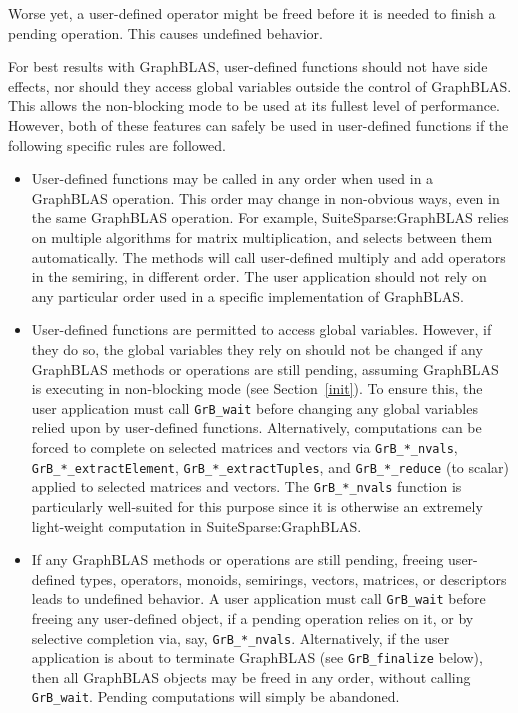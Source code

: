 \documentclass[12pt]{article}
\begin{document}
Worse yet, a user-defined operator might be freed before it is needed to finish
a pending operation.  This causes undefined behavior.

For best results with GraphBLAS, user-defined functions should not have side
effects, nor should they access global variables outside the control of
GraphBLAS.  This allows the non-blocking mode to be used at its fullest level
of performance.  However, both of these features can safely be used in
user-defined functions if the following specific rules are followed.

\begin{itemize}

\item User-defined functions may be called in any order when used in a
    GraphBLAS operation.  This order may change in non-obvious ways, even in
    the same GraphBLAS operation.  For example, SuiteSparse:\-GraphBLAS relies
    on multiple algorithms for matrix multiplication, and selects between them
    automatically.  The methods will call user-defined multiply and add
    operators in the semiring, in different order.  The user application should
    not rely on any particular order used in a specific implementation of
    GraphBLAS.

\item User-defined functions are permitted to access global variables.
    However, if they do so, the global variables they rely on should not be
    changed if any GraphBLAS methods or operations are still pending, assuming
    GraphBLAS is executing in non-blocking mode (see Section~\ref{init}).  To
    ensure this, the user application must call \verb'GrB_wait' before changing
    any global variables relied upon by user-defined functions.  Alternatively,
    computations can be forced to complete on selected matrices and vectors via
    \verb'GrB_*_nvals', \verb'GrB_*_extractElement',
    \verb'GrB_*_extractTuples', and \verb'GrB_*_reduce' (to scalar) applied to
    selected matrices and vectors.  The \verb'GrB_*_nvals' function is
    particularly well-suited for this purpose since it is otherwise an
    extremely light-weight computation in SuiteSparse:GraphBLAS.

\item If any GraphBLAS methods or operations are still pending, freeing
    user-defined types, operators, monoids, semirings, vectors, matrices, or
    descriptors leads to undefined behavior.  A user application must call
    \verb'GrB_wait' before freeing any user-defined object, if a pending
    operation relies on it, or by selective completion via, say,
    \verb'GrB_*_nvals'.  Alternatively, if the user application is about to
    terminate GraphBLAS (see \verb'GrB_finalize' below), then all GraphBLAS
    objects may be freed in any order, without calling \verb'GrB_wait'.
    Pending computations will simply be abandoned.

\end{itemize}
\end{document}
